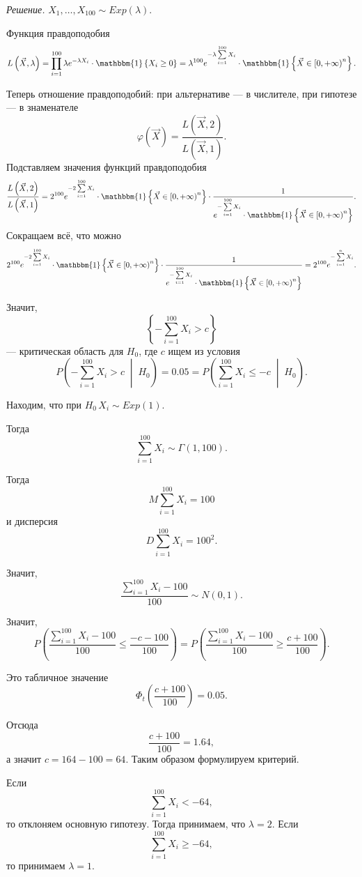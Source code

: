 \textit{Решение.} $X_1, \dotsc, X_{100} \sim Exp \left( \lambda \right) $.

Функция правдоподобия
$$L \left( \vec{X}, \lambda \right) =
  \prod \limits_{i = 1}^{100}
    \lambda e^{- \lambda X_i} \cdot \mathbbm{1} \left\{ X_i \geq 0 \right\} =
  \lambda^{100} e^{- \lambda \sum \limits_{i = 1}^{100} X_i} \cdot
  \mathbbm{1} \left\{ \vec{X} \in \left[ 0, + \infty \right)^n \right\}.$$

Теперь отношение правдоподобий: при альтернативе --- в числителе, при гипотезе ---
в знаменателе
$$ \varphi \left( \vec{X} \right) =
  \frac{L \left( \vec{X}, 2 \right) }{L \left( \vec{X}, 1 \right) }.$$
Подставляем значения функций правдоподобия
$$ \frac{L \left( \vec{X}, 2 \right) }{L \left( \vec{X}, 1 \right) } =
  2^{100} e^{-2 \sum \limits_{i = 1}^{100} X_i} \cdot \mathbbm{1} \left\{ \vec{X} \in \left[ 0, + \infty \right)^n \right\} \cdot
  \frac{1}{e^{- \sum \limits_{i = 1}^{100} X_i} \cdot \mathbbm{1} \left\{ \vec{X} \in \left[ 0, + \infty \right)^n \right\} }.$$
Сокращаем всё, что можно
$$2^{100} e^{-2 \sum \limits_{i = 1}^{100} X_i} \cdot \mathbbm{1} \left\{ \vec{X} \in \left[ 0, + \infty \right)^n \right\} \cdot
  \frac{1}{e^{- \sum \limits_{i = 1}^{100} X_i} \cdot \mathbbm{1} \left\{ \vec{X} \in \left[ 0, + \infty \right)^n \right\} } =
  2^{100} e^{- \sum \limits_{i = 1}^n X_i}.$$

Значит,
$$ \left\{ - \sum \limits_{i = 1}^{100} X_i > c \right\} $$
--- критическая область для $H_0$, где $c$ ищем из условия
$$P \left( - \sum \limits_{i = 1}^{100} X_i > c \; \middle| \; H_0 \right) =
  0.05 =
  P \left( \sum \limits_{i = 1}^{100} X_i \leq - c \; \middle| \; H_0 \right).$$

Находим, что при $H_0 \, X_i \sim Exp \left( 1 \right) $.

Тогда
$$ \sum \limits_{i = 1}^{100} X_i \sim
  \Gamma \left( 1, 100 \right).$$

Тогда
$$M \sum \limits_{i = 1}^{100} X_i =
  100$$
и дисперсия
$$D \sum \limits_{i = 1}^{100} X_i =
  100^2.$$

Значит,
$$ \frac{ \sum \limits_{i = 1}^{100} X_i - 100}{100} \sim
  N \left( 0, 1 \right).$$

Значит,
$$P \left( \frac{ \sum \limits_{i = 1}^{100} X_i - 100}{100} \leq \frac{-c - 100}{100} \right) =
    P \left( \frac{ \sum \limits_{i = 1}^{100} X_i - 100}{100} \geq \frac{c + 100}{100} \right).$$

Это табличное значение
$$ \Phi_t \left( \frac{c + 100}{100} \right) =
  0.05.$$

Отсюда
$$ \frac{c + 100}{100} =
  1.64,$$
а значит $c = 164 - 100 = 64$.
Таким образом формулируем критерий.

Если
$$ \sum \limits_{i = 1}^{100} X_i <
  -64,$$
то отклоняем основную гипотезу.
Тогда принимаем, что $ \lambda = 2$.
Если
$$ \sum \limits_{i = 1}^{100} X_i \geq
  -64,$$
то принимаем $ \lambda = 1$.
